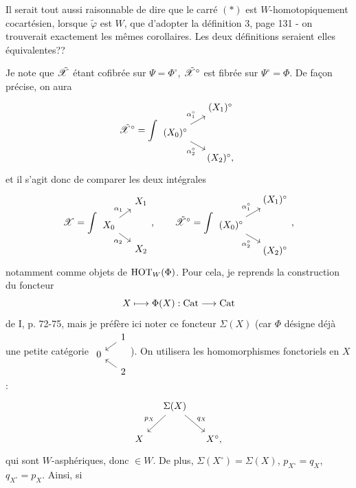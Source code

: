 Il serait tout aussi raisonnable de dire que le carré $(*)$ est $W$-homotopiquement cocartésien, lorsque $\tilde{\varphi}$ est $W$, que d'adopter la définition 3, page 131 - on trouverait exactement les mêmes corollaires. Les deux définitions seraient elles équivalentes?? %


Je note que $\tilde{\mathscr{X}}$ étant cofibrée sur $\Psi=\Phi^\circ$, $\tilde{\mathscr{X}}^\circ$ est fibrée sur $\Psi^\circ=\Phi$. De façon précise, on aura
\[
\tsX^\circ = \int
\begin{tikzcd}[row sep=small, column sep=small]
 & (X_1)^\circ \\
(X_0)^\circ \arrow[ur, "\alpha_1^\circ"] \arrow[dr, "\alpha_2^\circ"'] & \\
 & (X_2)^\circ,
\end{tikzcd}
\]
et il s'agit donc de comparer les deux intégrales
\[
\sX = \int
\begin{tikzcd}[row sep=small, column sep=small]
 & X_1 \\
X_0 \arrow[ur, "\alpha_1"] \arrow[dr, "\alpha_2"'] & \\
 & X_2
\end{tikzcd}
, \qquad
\tsX^\circ = \int
\begin{tikzcd}[row sep=small, column sep=small]
 & (X_1)^\circ \\
(X_0)^\circ \arrow[ur, "\alpha_1^\circ"] \arrow[dr, "\alpha_2^\circ"'] & \\
 & (X_2)^\circ
\end{tikzcd}
,
\]
notamment comme objets de $\mathrm{HOT}_W(\Phi)$. Pour cela, je reprends la construction du foncteur
\[
X \longmapsto \Phi(X) : \mathrm{Cat} \longrightarrow \mathrm{Cat}
\]
de I, p. 72-75, mais je préfère ici noter ce foncteur $\Sigma(X)$ (car $\Phi$ désigne déjà une petite catégorie $\begin{tikzcd}[row sep=tiny, column sep=small]
 & 1 \arrow[dl] \\
0 & \\
 & 2 \arrow[ul]
\end{tikzcd}$). On utilisera les homomorphismes fonctoriels en $X$ :
\[
\begin{tikzcd}[column sep=small]
 & \Sigma(X) \arrow[dl, "p_X"'] \arrow[dr, "q_X"] & \\
X & & X^\circ,
\end{tikzcd}
\]
qui sont $W$-asphériques, donc $\in W$. De plus, $\Sigma(X^\circ)=\Sigma(X)$, $p_{X^\circ}=q_X$, $q_{X^\circ}=p_X$. Ainsi, si
